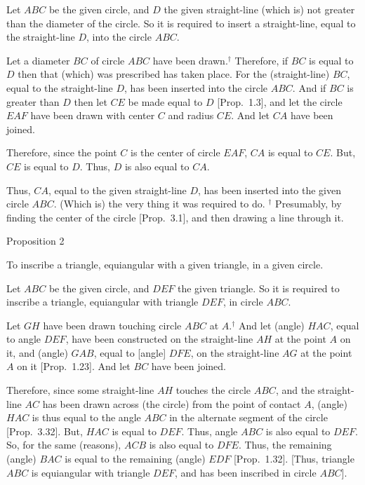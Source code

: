\epsfysize=2.2in
\centerline{}

Let $ABC$ be the given circle, and $D$ the given straight-line (which is) not greater than
the diameter of the circle. So it is required to insert a straight-line, equal to the
straight-line $D$, into the circle $ABC$.

Let a diameter $BC$ of circle $ABC$ have been drawn.$^\dag$ Therefore, if
$BC$ is equal to $D$ then that (which)  was prescribed has taken place.
For the (straight-line) $BC$, equal to the straight-line $D$, has been inserted into the circle $ABC$.
And if $BC$ is greater than $D$ then let $CE$ be made equal to $D$ [Prop.~1.3], and let the circle $EAF$ have been drawn with center $C$ and radius $CE$. And let $CA$ have been joined.

Therefore, since the point $C$ is the center of  circle $EAF$, $CA$ is equal to $CE$. But,
$CE$ is equal to $D$. Thus, $D$ is also equal to $CA$.

Thus, $CA$, equal to the given straight-line $D$,  has been inserted into
the given circle $ABC$. (Which is) the very thing it was required to do.
{\footnotesize \noindent$^\dag$ Presumably, by finding the center of the circle [Prop.~3.1], and then
drawing a line through it.}


\begin{center}
{\large Proposition 2}
\end{center}

To inscribe a triangle, equiangular with a given triangle, in a given circle.

\epsfysize=2in
\centerline{}

Let $ABC$ be the given circle, and $DEF$ the given triangle. So it is required
to inscribe a triangle, equiangular with triangle $DEF$, in circle $ABC$.

Let $GH$ have been drawn touching circle $ABC$ at $A$.$^\dag$ And let  (angle) $HAC$, equal to angle $DEF$,  have been constructed
on the straight-line $AH$ at the point $A$ on it, and (angle) $GAB$, equal to
[angle] $DFE$,  on the straight-line $AG$ at the point $A$ on it
 [Prop.~1.23]. And let $BC$ have been joined.
 
 Therefore, since some straight-line $AH$ touches the circle $ABC$, and the
 straight-line $AC$ has been drawn across (the circle) from the point of
 contact $A$, (angle) $HAC$ is thus equal to the angle $ABC$ in the alternate
 segment of the circle [Prop.~3.32]. But, $HAC$ is equal to $DEF$.
 Thus, angle $ABC$ is also equal to $DEF$. So, for the same (reasons),
 $ACB$ is also equal to $DFE$.  Thus, the remaining (angle) $BAC$ is equal
 to the remaining (angle) $EDF$ [Prop.~1.32]. [Thus, triangle
 $ABC$ is equiangular with triangle $DEF$, and has been inscribed in circle
 $ABC$].
 
